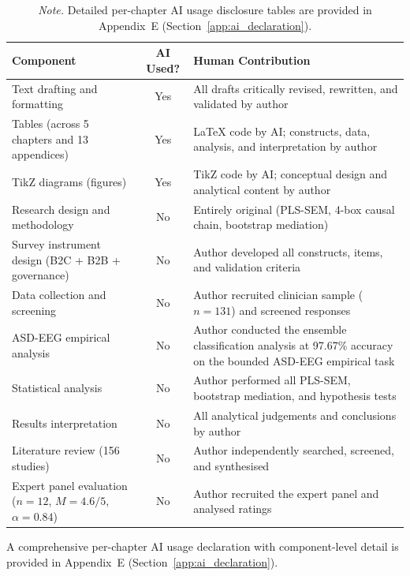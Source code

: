 \documentclass[12pt,a4paper,oneside]{report}
\begin{document}
\vspace{0.5em}
\begin{table}[htbp]
\centering
\footnotesize
\begin{tabularx}{\textwidth}{@{} L c L @{}}
\toprule
\textbf{Component} & \textbf{AI Used?} & \textbf{Human Contribution} \\
\midrule
Text drafting and formatting & Yes & All drafts critically revised, rewritten, and validated by author \\
Tables (across 5 chapters and 13 appendices) & Yes & LaTeX code by AI; constructs, data, analysis, and interpretation by author \\
TikZ diagrams (figures) & Yes & TikZ code by AI; conceptual design and analytical content by author \\
Research design and methodology & No & Entirely original (PLS-SEM, 4-box causal chain, bootstrap mediation) \\
Survey instrument design (B2C + B2B + governance) & No & Author developed all constructs, items, and validation criteria \\
Data collection and screening & No & Author recruited clinician sample ($n=131$) and screened responses \\
ASD-EEG empirical analysis & No & Author conducted the ensemble classification analysis at 97.67\% accuracy on the bounded ASD-EEG empirical task \\
Statistical analysis & No & Author performed all PLS-SEM, bootstrap mediation, and hypothesis tests \\
Results interpretation & No & All analytical judgements and conclusions by author \\
Literature review (156 studies) & No & Author independently searched, screened, and synthesised \\
Expert panel evaluation ($n=12$, $M=4.6/5$, $\alpha=0.84$) & No & Author recruited the expert panel and analysed ratings \\
\bottomrule
\end{tabularx}
\caption*{\footnotesize\textit{Note.} Detailed per-chapter AI usage disclosure tables are provided in Appendix~E (Section~\ref{app:ai_declaration}).}
\end{table}

\noindent A comprehensive per-chapter AI usage declaration with component-level detail is provided in Appendix~E (Section~\ref{app:ai_declaration}).

\vspace{1.5cm}
\end{document}
